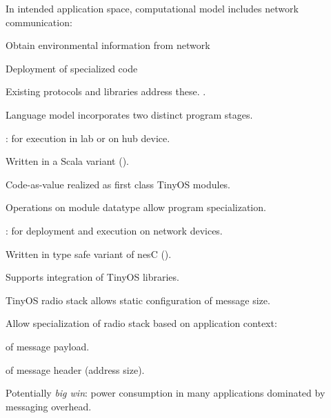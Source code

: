 \stopslide


In intended application space, computational model includes network 
communication:
\begin{citemize}
\item Obtain environmental information from network
\item Deployment of specialized code
\end{citemize}
Existing protocols and libraries address these. .
\stopslide

Language model incorporates two distinct program stages.
\begin{citemize}
\item {}: for execution in lab or 
on hub device.
\begin{citemize}
\item Written in a Scala variant ().
\item Code-as-value realized as first class TinyOS modules.
\item Operations on module datatype allow program specialization.
\end{citemize}
\item {}: for deployment 
and execution on network devices.
\begin{citemize}
\item Written in type safe variant of nesC ().
\item Supports integration of TinyOS libraries.
\end{citemize}
\end{citemize}

\stopslide


TinyOS radio stack allows static configuration of message size.

Allow specialization of radio stack based on application context:
\begin{citemize}
 \item {} of message payload.
 \item {} of message header (address size).
\end{citemize}
Potentially \emph{big win}: power consumption in many applications
dominated by messaging overhead.
\stopslide

